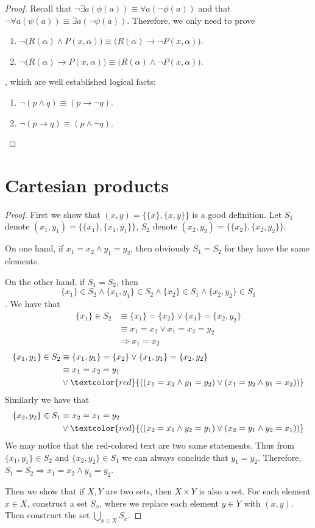 \begin{proof}
	Recall that $\neg\exists a(\phi(a)) \equiv \forall a(\neg \phi(a))$ and that $\neg\forall a(\psi(a)) \equiv \exists a(\neg\psi(a))$. Therefore, we only need to prove
	\begin{enumerate}
		\item $\neg\bigl( R(\alpha) \wedge P(x,\alpha) \bigr) \equiv \bigl( R(\alpha) \to \neg P(x,\alpha) \bigr)$.
		\item $\neg\bigl( R(\alpha) \to P(x,\alpha) \bigr) \equiv \bigl( R(\alpha) \wedge \neg P(x,\alpha) \bigr)$.
	\end{enumerate}
	, which are well established logical facts:
	\begin{enumerate}
		\item $\neg (p \wedge q) \equiv (p \to \neg q)$.
		\item $\neg (p \to q) \equiv (p \wedge \neg q)$.
	\end{enumerate}
\end{proof}

\section{Cartesian products}
\begin{proof}
First we show that $(x,y) = \{\{x\},\{x,y\}\}$ is a good definition. 
Let $S_1$ denote $(x_1,y_1) = \{\{x_1\},\{x_1,y_1\}\}$, $S_2$ denote 
$(x_2,y_2) = \{\{x_2\},\{x_2,y_2\}\}$.

On one hand, if $x_1=x_2\wedge y_1=y_2$, then obviously $S_1=S_2$ for they have the same elements.

On the other hand, if $S_1 = S_2$, then 
\[
\{x_1\} \in S_2 \wedge \{x_1,y_1\} \in S_2 \wedge
\{x_2\} \in S_1 \wedge \{x_2,y_2\} \in S_1 
\].
We have that 
\begin{align*}
\{x_1\} \in S_2 &\equiv \{x_1\} = \{x_2\} \vee \{x_1\} = \{x_2,y_2\} \\
&\equiv x_1=x_2 \vee x_1=x_2=y_2 \\
&\Longrightarrow x_1=x_2
\end{align*}
\begin{align*}
\{x_1,y_1\} \in S_2 &\equiv \{x_1,y_1\} = \{x_2\} \vee \{x_1,y_1\} = \{x_2,y_2\} \\
&\equiv x_1=x_2=y_1 \\
&\vee \textcolor{red}{((x_1=x_2\wedge y_1=y_2)\vee(x_1=y_2\wedge y_1=x_2))} 
\end{align*}
Similarly we have that
\begin{align*}
\{x_2,y_2\} \in S_1 
&\equiv x_2=x_1=y_2 \\
&\vee \textcolor{red}{((x_2=x_1\wedge y_2=y_1)\vee(x_2=y_1\wedge y_2=x_1))}
\end{align*}
We may notice that the red-colored text are two same statements. Thus from $\{x_1,y_1\} \in S_2$ and 
$\{x_2,y_2\} \in S_1$ we can always conclude that $y_1=y_2$. Therefore, 
$S_1 = S_2 \Longrightarrow x_1=x_2\wedge y_1=y_2$.

Then we show that if $X,Y$ are two sets, then $X \times Y$ is also a set. For each element $x \in X$, 
construct a set $S_x$, where we replace each element $y \in Y$ with $(x,y)$. Then construct the set 
$\bigcup_{x \in X}S_x$.
\end{proof}

